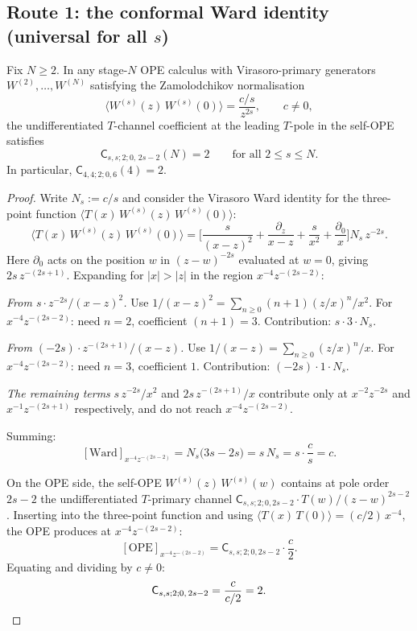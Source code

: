 \documentclass[11pt]{article}
\begin{document}
\subsection{Route 1: the conformal Ward identity (universal for all $s$)}

\begin{proposition}
\label{prop:universal-T-coefficient}
Fix $N\ge 2$.  In any stage-$N$ OPE calculus with Virasoro-primary
generators $W^{(2)},\dots,W^{(N)}$ satisfying the Zamolodchikov
normalisation
\[
\langle W^{(s)}(z)\,W^{(s)}(0)\rangle = \frac{c/s}{z^{2s}},
\qquad c\neq 0,
\]
the undifferentiated $T$-channel coefficient at the leading $T$-pole
in the self-OPE satisfies
\[
\mathsf{C}_{s,s;2;0,\,2s-2}(N)=2
\qquad\text{for all } 2\le s\le N.
\]
In particular, $\mathsf{C}_{4,4;2;0,6}(4)=2$.
\end{proposition}

\begin{proof}
Write $N_s:=c/s$ and consider the Virasoro Ward identity for the
three-point function $\langle T(x)\,W^{(s)}(z)\,W^{(s)}(0)\rangle$:
\begin{equation}\label{eq:ward-three-point}
\langle T(x)\,W^{(s)}(z)\,W^{(s)}(0)\rangle
=
\biggl[
\frac{s}{(x-z)^2}+\frac{\partial_z}{x-z}
+\frac{s}{x^2}+\frac{\partial_0}{x}
\biggr]
N_s\,z^{-2s}.
\end{equation}
Here $\partial_0$ acts on the position $w$ in $(z-w)^{-2s}$
evaluated at $w=0$, giving $2s\,z^{-(2s+1)}$.  Expanding for
$|x|>|z|$ in the region $x^{-4}z^{-(2s-2)}$:

\medskip
\noindent\emph{From $s\cdot z^{-2s}/(x-z)^2$.}\enspace
Use $1/(x-z)^2 = \sum_{n\ge 0}(n+1)(z/x)^n/x^2$.
For $x^{-4}z^{-(2s-2)}$: need $n=2$, coefficient $(n+1)=3$.
Contribution: $s\cdot 3\cdot N_s$.

\medskip
\noindent\emph{From $(-2s)\cdot z^{-(2s+1)}/(x-z)$.}\enspace
Use $1/(x-z) = \sum_{n\ge 0}(z/x)^n/x$.
For $x^{-4}z^{-(2s-2)}$: need $n=3$, coefficient $1$.
Contribution: $(-2s)\cdot 1\cdot N_s$.

\medskip
\noindent\emph{The remaining terms} $s\,z^{-2s}/x^2$ and
$2s\,z^{-(2s+1)}/x$ contribute only at $x^{-2}z^{-2s}$ and
$x^{-1}z^{-(2s+1)}$ respectively, and do not reach $x^{-4}z^{-(2s-2)}$.

\medskip
Summing:
\[
[\text{Ward}]_{x^{-4}z^{-(2s-2)}}
= N_s\bigl(3s - 2s\bigr)
= s\,N_s
= s\cdot \frac{c}{s}
= c.
\]

On the OPE side, the self-OPE $W^{(s)}(z)\,W^{(s)}(w)$ contains at
pole order $2s-2$ the undifferentiated $T$-primary channel
$\mathsf{C}_{s,s;2;0,2s-2}\cdot T(w)/(z-w)^{2s-2}$.  Inserting into
the three-point function and using
$\langle T(x)\,T(0)\rangle = (c/2)\,x^{-4}$, the OPE produces at
$x^{-4}z^{-(2s-2)}$:
\[
[\text{OPE}]_{x^{-4}z^{-(2s-2)}}
=
\mathsf{C}_{s,s;2;0,2s-2}\cdot \frac{c}{2}.
\]
Equating and dividing by $c\neq 0$:
\[
\mathsf{C}_{s,s;2;0,\,2s-2}
= \frac{c}{c/2}
= 2.
\qedhere
\]
\end{proof}
\end{document}
